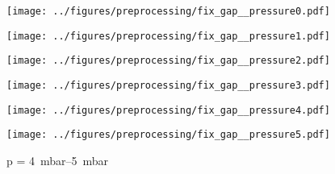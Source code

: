 \begin{figure}[htbp]
    \centering

    \begin{minipage}[t]{0.32\textwidth}
        \centering
        \texttt{[image: ../figures/preprocessing/fix\_gap\_\_pressure0.pdf]}
        \caption{p = \SI{0}{\milli\bar}}
        \label{fig:fix_gap_p00}
    \end{minipage}\hfill
    \begin{minipage}[t]{0.32\textwidth}
        \centering
        \texttt{[image: ../figures/preprocessing/fix\_gap\_\_pressure1.pdf]}
        \caption{p = \SIrange{0}{1}{\milli\bar}}
        \label{fig:fix_gap_p0}
    \end{minipage}\hfill
    \begin{minipage}[t]{0.32\textwidth}
        \centering
        \texttt{[image: ../figures/preprocessing/fix\_gap\_\_pressure2.pdf]}
        \caption{p = \SIrange{1}{2}{\milli\bar}}
        \label{fig:fix_gap_p1}
    \end{minipage}

    \vspace{0.5em}

    \begin{minipage}[t]{0.32\textwidth}
        \centering
        \texttt{[image: ../figures/preprocessing/fix\_gap\_\_pressure3.pdf]}
        \caption{p = \SIrange{2}{3}{\milli\bar}}
        \label{fig:fix_gap_p2}
    \end{minipage}\hfill
    \begin{minipage}[t]{0.32\textwidth}
        \centering
        \texttt{[image: ../figures/preprocessing/fix\_gap\_\_pressure4.pdf]}
        \caption{p = \SIrange{3}{4}{\milli\bar}}
        \label{fig:fix_gap_p3}
    \end{minipage}\hfill
    \begin{minipage}[t]{0.32\textwidth}
        \centering
        \texttt{[image: ../figures/preprocessing/fix\_gap\_\_pressure5.pdf]}
        \caption{p = \SIrange{4}{5}{\milli\bar}}
        \label{fig:fix_gap_p4}
    \end{minipage}

    \vspace{0.5em}


\end{figure}
